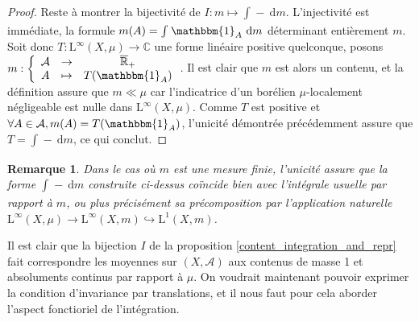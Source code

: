 \documentclass[a4paper,12pt]{article}
\newtheorem{remark}[theorem]{Remarque}
\newcommand{\R}{\mathbb{R}}
\newcommand{\C}{\mathbb{C}}
\newcommand{\indic}{\mathbbm{1}}
\newcommand{\integral}[4]{\int_{#1}^{#2} #3~\mathrm{d}#4}
\newcommand\fundef[3]{#1: \left\{\begin{array}{ccc}#2\\#3\end{array}\right.}
\newcommand{\closure}[1]{\overline{#1}}
\newcommand{\blank}{{-}}
\newcommand{\TODO}[1]{{\color{red}TODO :} #1}
\begin{document}
\begin{proof}
    Reste à montrer la bijectivité de $I:m\mapsto \integral{}{}{\blank}{m}$. L'injectivité est immédiate, la formule $m(A) = \integral{}{}{\indic_A}{m}$ déterminant
    entièrement $m$. Soit donc $T : \mathrm{L}^\infty(X, \mu)\to\C$ une forme linéaire positive quelconque, posons $\fundef{m}{\mathcal{A}&\to&\closure{\R}_+}{A&\mapsto&T(\indic_A)}$.
    Il est clair que $m$ est alors un contenu, et la définition assure que $m\ll\mu$ car l'indicatrice d'un borélien $\mu$-localement négligeable
    est nulle dans $\mathrm{L}^\infty(X,\mu)$. Comme $T$ est positive et $\forall A\in\mathcal{A}, m(A)=T(\indic_A)$, l'unicité 
    démontrée précédemment assure que $T = \integral{}{}{\blank}{m}$, ce qui conclut.
\end{proof}


\begin{remark}
    Dans le cas où $m$ est une mesure finie, l'unicité assure que la forme $\integral{}{}{\blank}{m}$ construite ci-dessus coïncide bien avec l'intégrale usuelle
    par rapport à $m$, ou plus précisément sa précomposition
    par l'application naturelle $\mathrm{L}^\infty(X, \mu)\to\mathrm{L}^\infty(X, m)\hookrightarrow\mathrm{L}^1(X, m)$.
\end{remark}

Il est clair que la bijection $I$ de la proposition \ref{content_integration_and_repr} fait correspondre les moyennes 
sur $(X, \mathcal{A})$ aux contenus de masse 1 et absoluments continus par rapport à $\mu$. On voudrait maintenant pouvoir exprimer 
la condition d'invariance par translations, et il nous faut pour cela aborder l'aspect fonctioriel de l'intégration.
\end{document}
